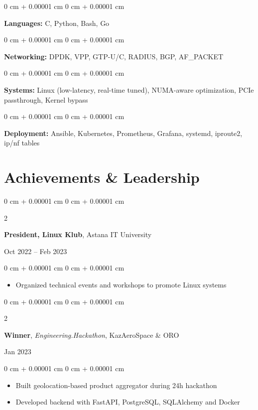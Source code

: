 \documentclass[10pt, letterpaper]{article}
\newenvironment{highlights}{
    \begin{itemize}[
        topsep=0.10 cm,
        parsep=0.10 cm,
        partopsep=0pt,
        itemsep=0pt,
        leftmargin=0 cm + 10pt
    ]
}{
    \end{itemize}
} %
\newenvironment{onecolentry}{
    \begin{adjustwidth}{
        0 cm + 0.00001 cm
    }{
        0 cm + 0.00001 cm
    }
}{
    \end{adjustwidth}
} %
\newenvironment{twocolentry}[2][]{
    \onecolentry
    \def\secondColumn{#2}
    \setcolumnwidth{\fill, 4.5 cm}
    \begin{paracol}{2}
}{
    \switchcolumn \raggedleft \secondColumn
    \end{paracol}
    \endonecolentry
} %
\begin{document}
\begin{onecolentry}
    \textbf{Languages:} C, Python, Bash, Go
\end{onecolentry}

\vspace{0.2 cm}

\begin{onecolentry}
    \textbf{Networking:} DPDK, VPP, GTP-U/C, RADIUS, BGP, AF\_PACKET
\end{onecolentry}

\vspace{0.2 cm}

\begin{onecolentry}
    \textbf{Systems:} Linux (low-latency, real-time tuned), NUMA-aware optimization, PCIe passthrough, Kernel bypass
\end{onecolentry}

\vspace{0.2 cm}

\begin{onecolentry}
    \textbf{Deployment:} Ansible, Kubernetes, Prometheus, Grafana, systemd, iproute2, ip/nf tables
\end{onecolentry}

\section{Achievements \& Leadership}

\begin{twocolentry}{
    Oct 2022 – Feb 2023
}
    \textbf{President, Linux Klub}, Astana IT University
\end{twocolentry}

\vspace{0.10 cm}
\begin{onecolentry}
    \begin{highlights}
        \item Organized technical events and workshops to promote Linux systems \end{highlights}
\end{onecolentry}

\vspace{0.2 cm}

\begin{twocolentry}{
    Jan 2023
}
    \textbf{Winner}, \textit{Engineering.Hackathon}, KazAeroSpace \& ORO
\end{twocolentry}

\vspace{0.10 cm}
\begin{onecolentry}
    \begin{highlights}
        \item Built geolocation-based product aggregator during 24h hackathon
        \item Developed backend with FastAPI, PostgreSQL, SQLAlchemy and Docker
    \end{highlights}
\end{onecolentry}
\end{document}
